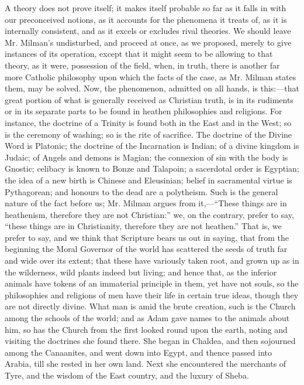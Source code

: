 A theory does not prove itself; it makes itself
probable so far as it falls in with our preconceived notions, as
it accounts for the phenomena it treats of, as it is internally
consistent, and as it excels or excludes rival theories. We should
leave Mr. Milman's undisturbed, and proceed at once, as we proposed,
merely to give instances of its operation, except that it might seem
to be allowing to that theory, as it were, possession of the field,
when, in truth, there is another far more Catholic philosophy upon
which the facts of the case, as Mr. Milman states them, may be solved.
Now, the phenomenon, admitted on all hands, is this:—that great
portion of what is generally received as Christian truth, is in its
rudiments or in its separate parts to be found in heathen philosophies
and religions. For instance, the doctrine of a Trinity is found both
in the East and in the West; so is the ceremony of washing; so is the
rite of sacrifice. The doctrine of the Divine Word is Platonic; the
doctrine of the Incarnation is Indian; of a divine kingdom is Judaic;
of Angels and demons is Magian; the connexion of sin with the body is
Gnostic; celibacy is known to Bonze and Talapoin; a sacerdotal order
is Egyptian; the idea of a new birth is Chinese and Eleusinian; belief
in sacramental virtue is Pythagorean; and honours to the dead are a
polytheism. Such is the general nature of the fact before us; Mr.
Milman argues from it,—``These things are in heathenism, therefore
they are not Christian:'' we, on the contrary, prefer to say, ``these
things are in Christianity, therefore they are not heathen.'' That is,
we prefer to say, and we think that Scripture bears us out in saying,
that from the beginning the Moral Governor of the world has scattered
the seeds of truth far and wide over its extent; that these have
variously taken root, and grown up as in the wilderness, wild plants
indeed but living; and hence that, as the inferior animals have tokens of an immaterial principle in them, yet have not souls, so the
philosophies and religions of men have their life in certain true
ideas, though they are not directly divine. What man is amid the brute
creation, such is the Church among the schools of the world; and as
Adam gave names to the animals about him, so has the Church from the
first looked round upon the earth, noting and visiting the doctrines
she found there. She began in Chaldea, and then sojourned among the
Canaanites, and went down into Egypt, and thence passed into Arabia,
till she rested in her own land. Next she encountered the merchants of
Tyre, and the wisdom of the East country, and the luxury of Sheba.
